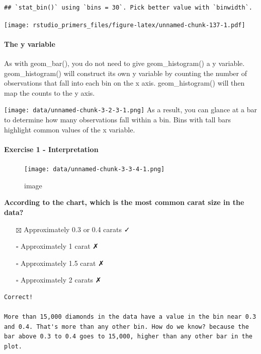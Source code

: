 \documentclass[
]{article}
\providecommand{\tightlist}{%
  \setlength{\itemsep}{0pt}\setlength{\parskip}{0pt}}
\begin{document}
\begin{verbatim}
## `stat_bin()` using `bins = 30`. Pick better value with `binwidth`.
\end{verbatim}

\texttt{[image: rstudio\_primers\_files/figure-latex/unnamed-chunk-137-1.pdf]}

\hypertarget{the-y-variable}{%
\paragraph{The y variable}\label{the-y-variable}}

As with geom\_bar(), you do not need to give geom\_histogram() a y
variable. geom\_histogram() will construct its own y variable by
counting the number of observations that fall into each bin on the x
axis. geom\_histogram() will then map the counts to the y axis.

\texttt{[image: data/unnamed-chunk-3-2-3-1.png]} As a result, you can
glance at a bar to determine how many observations fall within a bin.
Bins with tall bars highlight common values of the x variable.

\hypertarget{exercise-1---interpretation}{%
\paragraph{Exercise 1 -
Interpretation}\label{exercise-1---interpretation}}

\begin{figure}
\centering
\texttt{[image: data/unnamed-chunk-3-3-4-1.png]}
\caption{image}
\end{figure}

\textbf{According to the chart, which is the most common carat size in
the data?}

\begin{itemize}
\tightlist
\item[$\boxtimes$]
  Approximately 0.3 or 0.4 carats ✓
\item[$\square$]
  Approximately 1 carat ✗
\item[$\square$]
  Approximately 1.5 carat ✗
\item[$\square$]
  Approximately 2 carats ✗
\end{itemize}

\begin{verbatim}
Correct!

More than 15,000 diamonds in the data have a value in the bin near 0.3 and 0.4. That's more than any other bin. How do we know? because the bar above 0.3 to 0.4 goes to 15,000, higher than any other bar in the plot.
\end{verbatim}
\end{document}
